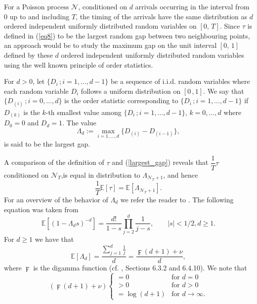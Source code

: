 For a Poisson process $\mathcal{N}$, conditioned on $d$ arrivals occurring in the interval from 0 up to and including $T$, the timing of the arrivals have the same distribution as $d$ ordered independent uniformly distributed random variables on $[0, \, T]$. Since $\tau$ is defined in (\ref{eq8}) to be the largest random gap between two neighbouring points, an approach would be to study the maximum gap on the unit interval $[0, \, 1]$ defined by these $d$ ordered independent uniformly distributed random variables using the well known principle of order statistics.
\begin{definition}
For $d > 0$, let $\{D_i\,; i = 1, \ldots, d-1 \}$ be a sequence of i.i.d. random variables where each random variable $D_i$ follows a uniform distribution on $[0 \,, 1]$. We say that $\{D_{(i)}\,; i = 0, \ldots, d \}$ is the order statistic corresponding to $\{D_i\,; i = 1, \ldots, d-1 \}$ if $D_{(k)}$ is the $k$-th smallest value among $\{D_i\,; i = 1, \ldots, d-1 \}$, $k = 0, \ldots, d$ where $D_0 =0$ and $D_d =1$. The value 
\begin{equation}\label{largest_gap}
    \Lambda_{d} := \max_{i = 1, \ldots, d}\{D_{(i)} - D_{(i-1)}\},
\end{equation}
is said to be the largest gap.
\end{definition}
A comparison of the definition of $\tau$ and (\ref{largest_gap}) reveals that $\dfrac{1}{T}\tau$ conditioned on $\mathcal{N}_T$,is equal in distribution to $\Lambda_{\mathcal{N}_T+1}$, and hence
\begin{equation}\label{exp_tau}
    \dfrac{1}{T}\mathbb{E}[\tau] = \mathbb{E}[\Lambda_{\mathcal{N}_T+1}].
\end{equation}
For an overview of the behavior of $ \Lambda_{d}$ we refer the reader to . The following equation was taken from  
\begin{equation*}
    \mathbb{E}[(1-\Lambda_{d}s)^{-d}] = \dfrac{d!}{1-s} \prod_{j=2}^d \dfrac{1}{j-s}, \qquad |s|< 1/2, d \geq 1.
\end{equation*}
For $d \geq 1$ we have that
\begin{equation*}
     \mathbb{E}[\Lambda_{d}] = \dfrac{\sum_{j=1}^d\frac{1}{j}}{d} = \dfrac{\digamma (d+1)+ \nu}{d},
\end{equation*}
where $\digamma$ is the digamma function (cf. , Sections 6.3.2 and 6.4.10).
We note that 
\[
 (\digamma (d+1)+ \nu)
  \begin{cases} 
   = 0 & \text{for } d = 0 \\
   > 0  & \text{for } d > 0 \\
   = \log(d+1) & \text{for } d \to \infty.
  \end{cases}
\]
